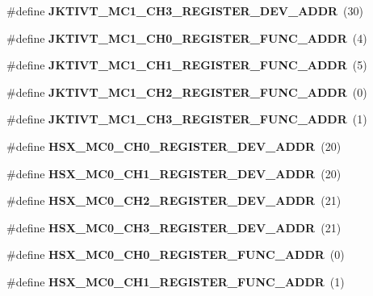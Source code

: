 \begin{DoxyCompactItemize}
\mbox{\label{types_8h_a5e3e78fbf78ab646158d0cbfcd56c876}} 
\#define {\bfseries J\+K\+T\+I\+V\+T\+\_\+\+M\+C1\+\_\+\+C\+H3\+\_\+\+R\+E\+G\+I\+S\+T\+E\+R\+\_\+\+D\+E\+V\+\_\+\+A\+D\+DR}~(30)
\item 
\mbox{\label{types_8h_aa713c04c5c8e574b43e0d6d6fa96be7e}} 
\#define {\bfseries J\+K\+T\+I\+V\+T\+\_\+\+M\+C1\+\_\+\+C\+H0\+\_\+\+R\+E\+G\+I\+S\+T\+E\+R\+\_\+\+F\+U\+N\+C\+\_\+\+A\+D\+DR}~(4)
\item 
\mbox{\label{types_8h_a59d01471d69423a214dc8db3519af3de}} 
\#define {\bfseries J\+K\+T\+I\+V\+T\+\_\+\+M\+C1\+\_\+\+C\+H1\+\_\+\+R\+E\+G\+I\+S\+T\+E\+R\+\_\+\+F\+U\+N\+C\+\_\+\+A\+D\+DR}~(5)
\item 
\mbox{\label{types_8h_ab8abdd8a242a3a1314fb5b30d2b9b613}} 
\#define {\bfseries J\+K\+T\+I\+V\+T\+\_\+\+M\+C1\+\_\+\+C\+H2\+\_\+\+R\+E\+G\+I\+S\+T\+E\+R\+\_\+\+F\+U\+N\+C\+\_\+\+A\+D\+DR}~(0)
\item 
\mbox{\label{types_8h_a42da512eaa955bd9aea434ad49a363d6}} 
\#define {\bfseries J\+K\+T\+I\+V\+T\+\_\+\+M\+C1\+\_\+\+C\+H3\+\_\+\+R\+E\+G\+I\+S\+T\+E\+R\+\_\+\+F\+U\+N\+C\+\_\+\+A\+D\+DR}~(1)
\item 
\mbox{\label{types_8h_a9b7316bd4085ecb228a3162e44418302}} 
\#define {\bfseries H\+S\+X\+\_\+\+M\+C0\+\_\+\+C\+H0\+\_\+\+R\+E\+G\+I\+S\+T\+E\+R\+\_\+\+D\+E\+V\+\_\+\+A\+D\+DR}~(20)
\item 
\mbox{\label{types_8h_ac66829c4c41afd34d9d0544e29a0e928}} 
\#define {\bfseries H\+S\+X\+\_\+\+M\+C0\+\_\+\+C\+H1\+\_\+\+R\+E\+G\+I\+S\+T\+E\+R\+\_\+\+D\+E\+V\+\_\+\+A\+D\+DR}~(20)
\item 
\mbox{\label{types_8h_a22c6d67f1ee7817e813715f94ca7a73c}} 
\#define {\bfseries H\+S\+X\+\_\+\+M\+C0\+\_\+\+C\+H2\+\_\+\+R\+E\+G\+I\+S\+T\+E\+R\+\_\+\+D\+E\+V\+\_\+\+A\+D\+DR}~(21)
\item 
\mbox{\label{types_8h_a53794d5b5631c9a1e7ebe9809a5c3993}} 
\#define {\bfseries H\+S\+X\+\_\+\+M\+C0\+\_\+\+C\+H3\+\_\+\+R\+E\+G\+I\+S\+T\+E\+R\+\_\+\+D\+E\+V\+\_\+\+A\+D\+DR}~(21)
\item 
\mbox{\label{types_8h_ac3f40f3476190aec6996e1ffd1da3c18}} 
\#define {\bfseries H\+S\+X\+\_\+\+M\+C0\+\_\+\+C\+H0\+\_\+\+R\+E\+G\+I\+S\+T\+E\+R\+\_\+\+F\+U\+N\+C\+\_\+\+A\+D\+DR}~(0)
\item 
\mbox{\label{types_8h_a5690c21a52958fe28e7871189d547280}} 
\#define {\bfseries H\+S\+X\+\_\+\+M\+C0\+\_\+\+C\+H1\+\_\+\+R\+E\+G\+I\+S\+T\+E\+R\+\_\+\+F\+U\+N\+C\+\_\+\+A\+D\+DR}~(1)
\item 
\mbox{\label{types_8h_ae4a27dd0916339108858f7bdbd326e91}} 

\end{DoxyCompactItemize}
